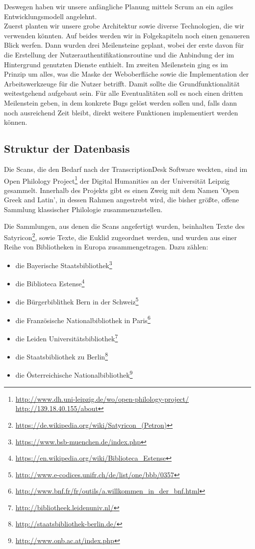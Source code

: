 \documentclass{article}
\begin{document}
Deswegen haben wir unsere anfängliche Planung mittels Scrum an ein agiles Entwicklungsmodell angelehnt.\\
Zuerst planten wir unsere grobe Architektur sowie diverse Technologien, die wir verwenden könnten.
Auf beides werden wir in Folgekapiteln noch einen genaueren Blick werfen. Dann wurden drei Meilensteine geplant,
wobei der erste davon für die Erstellung der Nutzerauthentifikationsroutine und die Anbindung der im Hintergrund genutzten Dienste enthielt.
Im zweiten Meilenstein ging es im Prinzip um alles, was die Maske der Weboberfläche sowie die Implementation der Arbeitswerkzeuge für die Nutzer betrifft.
Damit sollte die Grundfunktionalität weitestgehend aufgebaut sein. Für alle Eventualitäten soll es noch einen dritten Meilenstein geben,
in dem konkrete Bugs gelöst werden sollen und, falls dann noch ausreichend Zeit bleibt, direkt weitere Funktionen implementiert werden können.
\subsection{Struktur der Datenbasis}
Die Scans, die den Bedarf nach der TranscriptionDesk Software weckten,
sind im Open Philology Project\footnote{
    \url{http://www.dh.uni-leipzig.de/wo/open-philology-project/}\\
    \url{http://139.18.40.155/about}}
    der Digital Humanities an der Universität Leipzig gesammelt.
Innerhalb des Projekts gibt es einen Zweig mit dem Namen 'Open Greek and Latin', in dessen Rahmen angestrebt wird,
die bisher größte, offene Sammlung klassischer Philologie zusammenzustellen.

Die Sammlungen, aus denen die Scans angefertigt wurden, beinhalten Texte des Satyricon\footnote{\url{https://de.wikipedia.org/wiki/Satyricon_(Petron)}},
sowie Texte, die Euklid zugeordnet werden,
und wurden aus einer Reihe von Bibliotheken in Europa zusammengetragen. Dazu zählen:
\begin{itemize}
\item die Bayerische Staatsbibliothek\footnote{\url{https://www.bsb-muenchen.de/index.php}}
\item die Biblioteca Estense\footnote{\url{https://en.wikipedia.org/wiki/Biblioteca_Estense}}
\item die Bürgerbiblithek Bern in der Schweiz\footnote{\url{http://www.e-codices.unifr.ch/de/list/one/bbb/0357}}
\item die Französische Nationalbibliothek in Paris\footnote{\url{http://www.bnf.fr/fr/outils/a.willkommen_in_der_bnf.html}}
\item die Leiden Universitätsbibliothek\footnote{\url{http://bibliotheek.leidenuniv.nl/}}
\item die Staatsbibliothek zu Berlin\footnote{\url{http://staatsbibliothek-berlin.de/}}
\item die Österreichische Nationalbibliothek\footnote{\url{http://www.onb.ac.at/index.php}}
\end{itemize}
\end{document}
